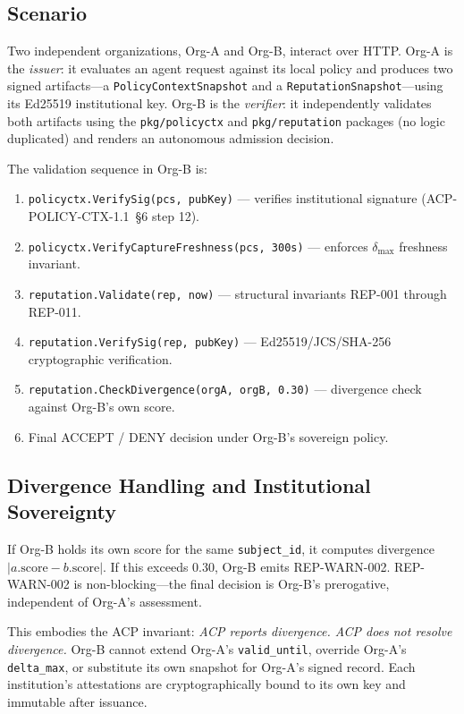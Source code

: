 \documentclass[11pt]{article}
\theoremstyle{definition}
\begin{document}
\subsection{Scenario}

Two independent organizations, Org-A and Org-B, interact over HTTP.
Org-A is the \emph{issuer}: it evaluates an agent request against its local policy and produces two signed artifacts---a \texttt{PolicyContextSnapshot} and a \texttt{ReputationSnapshot}---using its Ed25519 institutional key.
Org-B is the \emph{verifier}: it independently validates both artifacts using the \texttt{pkg/policyctx} and \texttt{pkg/reputation} packages (no logic duplicated) and renders an autonomous admission decision.

The validation sequence in Org-B is:
\begin{enumerate}[noitemsep]
  \item \texttt{policyctx.VerifySig(pcs, pubKey)} --- verifies institutional signature (ACP-POLICY-CTX-1.1~\S6 step 12).
  \item \texttt{policyctx.VerifyCaptureFreshness(pcs, 300s)} --- enforces $\delta_{\max}$ freshness invariant.
  \item \texttt{reputation.Validate(rep, now)} --- structural invariants REP-001 through REP-011.
  \item \texttt{reputation.VerifySig(rep, pubKey)} --- Ed25519/JCS/SHA-256 cryptographic verification.
  \item \texttt{reputation.CheckDivergence(orgA, orgB, 0.30)} --- divergence check against Org-B's own score.
  \item Final ACCEPT / DENY decision under Org-B's sovereign policy.
\end{enumerate}

\subsection{Divergence Handling and Institutional Sovereignty}

If Org-B holds its own score for the same \texttt{subject\_id}, it computes divergence $|a.\text{score} - b.\text{score}|$.
If this exceeds 0.30, Org-B emits REP-WARN-002.
REP-WARN-002 is non-blocking---the final decision is Org-B's prerogative, independent of Org-A's assessment.

This embodies the ACP invariant: \emph{ACP reports divergence. ACP does not resolve divergence.}
Org-B cannot extend Org-A's \texttt{valid\_until}, override Org-A's \texttt{delta\_max}, or substitute its own snapshot for Org-A's signed record.
Each institution's attestations are cryptographically bound to its own key and immutable after issuance.
\end{document}
